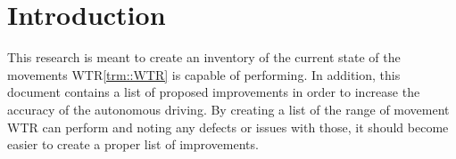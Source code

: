 \section{Introduction}
This research is meant to create an inventory of the current state of the movements WTR\ref{trm::WTR} is capable of performing.
In addition, this document contains a list of proposed improvements in order to increase the accuracy of the autonomous driving.
By creating a list of the range of movement WTR can perform and noting any defects or issues with those, it should become easier to create a proper list of improvements.

\newpage
